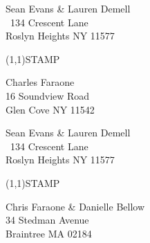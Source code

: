 \documentclass[12pt]{article}
\begin{document}
\begin{minipage}{.5\linewidth} \noindent
Sean Evans \& Lauren Demell\\\ 
134 Crescent Lane\\ 
Roslyn Heights NY 11577
\end{minipage}
\begin{minipage}{.5\linewidth \hspace{-.2in} \vspace{-.3in}}
\begin{flushright}
\framebox(1,1){STAMP}
\end{flushright}
\end{minipage}

\begin{center} \begin{Huge} \vspace*{\fill}
Charles Faraone\\
16 Soundview Road\\
Glen Cove NY 11542\\
\vspace{\fill} \end{Huge} \end{center}

\clearpage

\begin{minipage}{.5\linewidth} \noindent
Sean Evans \& Lauren Demell\\\ 
134 Crescent Lane\\ 
Roslyn Heights NY 11577
\end{minipage}
\begin{minipage}{.5\linewidth \hspace{-.2in} \vspace{-.3in}}
\begin{flushright}
\framebox(1,1){STAMP}
\end{flushright}
\end{minipage}

\begin{center} \begin{Huge} \vspace*{\fill}
Chris Faraone \& Danielle Bellow\\
34 Stedman Avenue\\
Braintree MA 02184\\
\vspace{\fill} \end{Huge} \end{center}

\clearpage
\end{document}
